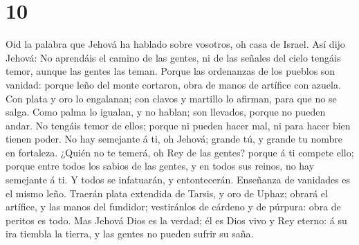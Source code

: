 \hypertarget{section-9}{%
\section{10}\label{section-9}}

 Oid la palabra que Jehová ha hablado sobre vosotros, oh
casa de Israel.  Así dijo Jehová: No aprendáis el camino de
las gentes, ni de las señales del cielo tengáis temor, aunque las gentes
las teman.  Porque las ordenanzas de los pueblos son
vanidad: porque leño del monte cortaron, obra de manos de artífice con
azuela.  Con plata y oro lo engalanan; con clavos y martillo
lo afirman, para que no se salga.  Como palma lo igualan, y
no hablan; son llevados, porque no pueden andar. No tengáis temor de
ellos; porque ni pueden hacer mal, ni para hacer bien tienen poder.
 No hay semejante á ti, oh Jehová; grande tú, y grande tu
nombre en fortaleza.  ¿Quién no te temerá, oh Rey de las
gentes? porque á ti compete ello; porque entre todos los sabios de las
gentes, y en todos sus reinos, no hay semejante á ti.  Y
todos se infatuarán, y entontecerán. Enseñanza de vanidades es el mismo
leño.  Traerán plata extendida de Tarsis, y oro de Uphaz;
obrará el artífice, y las manos del fundidor; vestiránlos de cárdeno y
de púrpura: obra de peritos es todo.  Mas Jehová Dios es la
verdad; él es Dios vivo y Rey eterno: á su ira tiembla la tierra, y las
gentes no pueden sufrir su saña.

